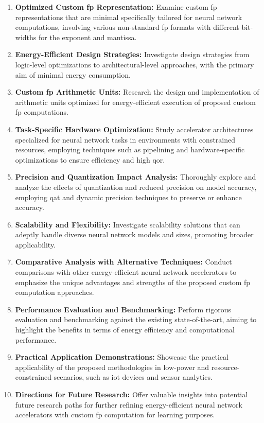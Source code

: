 \begin{enumerate}[label={\textbf{O\arabic*}}]
	\item \textbf{Optimized Custom \gls{fp} Representation:} 
	Examine custom \gls{fp} representations that are minimal specifically tailored for neural network computations, involving various non-standard \gls{fp} formats with different bit-widths for the exponent and mantissa.
	
	\item \textbf{Energy-Efficient Design Strategies:} 
	Investigate design strategies from logic-level optimizations to architectural-level approaches, with the primary aim of minimal energy consumption.
	
	\item \textbf{Custom \gls{fp} Arithmetic Units:} 
	Research the design and implementation of arithmetic units optimized for energy-efficient execution of proposed custom \gls{fp} computations.
	
	\item \textbf{Task-Specific Hardware Optimization:} 
	Study accelerator architectures specialized for neural network tasks in environments with constrained resources, employing techniques such as pipelining and hardware-specific optimizations to ensure efficiency and high \gls{qor}.
	
	\item \textbf{Precision and Quantization Impact Analysis:} 
	Thoroughly explore and analyze the effects of quantization and reduced precision on model accuracy, employing \gls{qat} and dynamic precision techniques to preserve or enhance accuracy.
	
	\item \textbf{Scalability and Flexibility:} 
	Investigate scalability solutions that can adeptly handle diverse neural network models and sizes, promoting broader applicability.
	
	\item \textbf{Comparative Analysis with Alternative Techniques:} 
	Conduct comparisons with other energy-efficient neural network accelerators to emphasize the unique advantages and strengths of the proposed custom \gls{fp} computation approaches.
	
	\item \textbf{Performance Evaluation and Benchmarking:} 
	Perform rigorous evaluation and benchmarking against the existing state-of-the-art, aiming to highlight the benefits in terms of energy efficiency and computational performance.
	
	\item \textbf{Practical Application Demonstrations:} 
	Showcase the practical applicability of the proposed methodologies in low-power and resource-constrained scenarios, such as \gls{iot} devices and sensor analytics.
	
	\item \textbf{Directions for Future Research:} 
	Offer valuable insights into potential future research paths for further refining energy-efficient neural network accelerators with custom \gls{fp} computation for learning purposes.
\end{enumerate}


